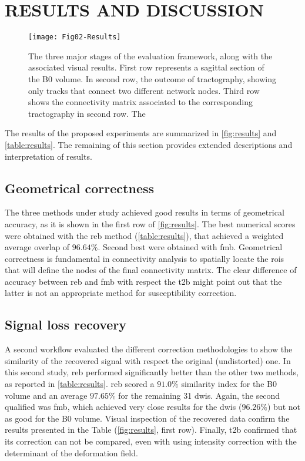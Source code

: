\section{RESULTS AND DISCUSSION}



\begin{figure*}[tpb]
   \centering
   \texttt{[image: Fig02-Results]}
   \caption{The three major stages of the evaluation framework,
   along with the associated visual results. First row represents
   a sagittal section of the B0 volume. In second row, the outcome
   of tractography, showing only tracks that connect two different
   network nodes. Third row shows the connectivity matrix associated
   to the corresponding tractography in second row. The }
   \label{fig:results}
\end{figure*}

The results of the proposed experiments are summarized
in \autoref{fig:results} and \autoref{table:results}.
The remaining of this section provides extended descriptions
and interpretation of results.

\subsection{Geometrical correctness}

The three methods under study achieved good results in
terms of geometrical accuracy, as it is shown in the first
row of \autoref{fig:results}. The best numerical scores
were obtained with the \gls*{reb} method (\autoref{table:results}),
that achieved a weighted average overlap of $96.64\%$. Second
best were obtained with \gls*{fmb}. Geometrical correctness
is fundamental in connectivity analysis to spatially locate the
\glspl*{roi} that will define the nodes of the final connectivity
matrix. The clear difference of accuracy between \gls*{reb} and \gls*{fmb}
with respect the \gls*{t2b} might point out that the latter is
not an appropriate method for susceptibility correction.	


\subsection{Signal loss recovery}

A second workflow evaluated the different correction 
methodologies to show the similarity of the recovered
signal with respect the original (undistorted) one. 
In this second study, \gls*{reb} performed significantly
better than the other two methods, as reported
in \autoref{table:results}. \gls*{reb} scored a $91.0\%$
similarity index for the B0 volume and an average $97.65\%$
for the remaining 31 \glspl*{dwi}. Again, the second
qualified was \gls*{fmb}, which achieved very close results
for the \glspl*{dwi} ($96.26\%$) but not as good for the B0
volume. Visual inspection of the recovered data confirm the 
results presented in the Table (\autoref{fig:results}, first
row). Finally, \gls*{t2b} confirmed that its correction
can not be compared, even with using intensity correction with
the determinant of the deformation field.

